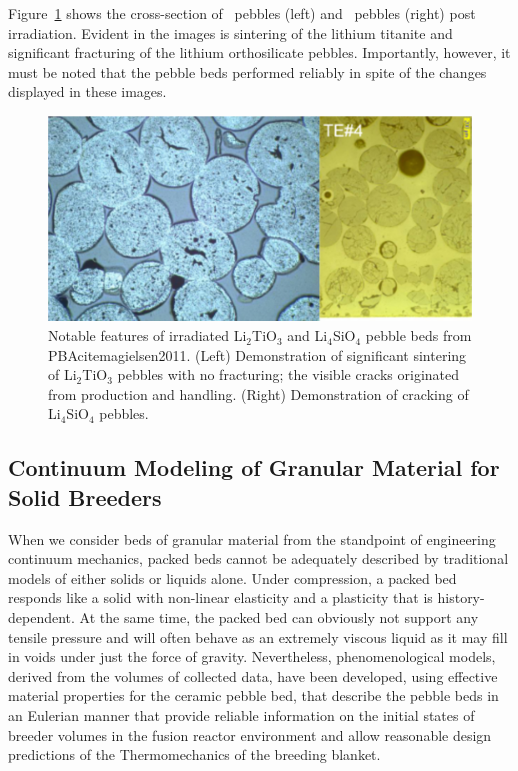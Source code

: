 Figure~\ref{fig:pba} shows the cross-section of \lit~pebbles (left) and \lis~pebbles (right) post irradiation. Evident in the images is sintering of the lithium titanite and significant fracturing of the lithium orthosilicate pebbles. Importantly, however, it must be noted that the pebble beds performed reliably in spite of the changes displayed in these images.\cite{Magielsen2007} 


\begin{figure}[t!]
\centering
\includegraphics[width=\singleimagewidth]{figures/Fig-10}
\caption{Notable features of irradiated Li$_2$TiO$_3$ and Li$_4$SiO$_4$ pebble beds from PBAcite{magielsen2011}. (Left) Demonstration of significant sintering of Li$_2$TiO$_3$ pebbles with no fracturing; the visible cracks originated from production and handling. (Right) Demonstration of cracking of Li$_4$SiO$_4$ pebbles.}
\label{fig:pba}
\end{figure}



\subsection{Continuum Modeling of Granular Material for Solid Breeders}
When we consider beds of granular material from the standpoint of engineering continuum mechanics, packed beds cannot be adequately described by traditional models of either solids or liquids alone. Under compression, a packed bed responds like a solid with non-linear elasticity and a plasticity that is history-dependent. At the same time, the packed bed can obviously not support any tensile pressure and will often behave as an extremely viscous liquid as it may fill in voids under just the force of gravity. Nevertheless, phenomenological models, derived from the volumes of collected data, have been developed, using effective material properties for the ceramic pebble bed, that describe the pebble beds in an Eulerian manner that provide reliable information on the initial states of breeder volumes in the fusion reactor environment and allow reasonable design predictions of the Thermomechanics of the breeding blanket. 

